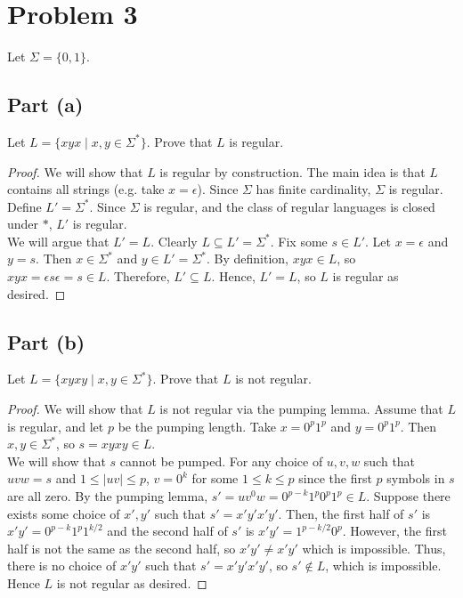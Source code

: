 \documentclass{article}
\begin{document}
\section*{Problem 3}

Let $\Sigma = \{ 0, 1 \}$.

\subsection*{Part (a)}

Let $L = \{ xyx \mid x, y \in \Sigma^* \}$. Prove that $L$ is regular.

\begin{proof}
    We will show that $L$ is regular by construction. The main idea is that $L$ contains all strings (e.g. take $x = \epsilon$). Since $\Sigma$ has finite 
    cardinality, $\Sigma$ is regular. Define $L' = \Sigma^*$. Since $\Sigma$ is regular, and the class of regular languages is closed under $*$, $L'$ is 
    regular. \\
    
    \noindent
    We will argue that $L' = L$. Clearly $L \subseteq L' = \Sigma^*$. Fix some $s \in L'$. Let $x = \epsilon$ and $y = s$. Then $x \in \Sigma^*$ and 
    $y \in L' = \Sigma^*$. By definition, $xyx \in L$, so $xyx = \epsilon s \epsilon = s \in L$. Therefore, $L' \subseteq L$. Hence, $L' = L$, so $L$ is regular 
    as desired.
\end{proof}

\subsection*{Part (b)}

Let $L = \{ xyxy \mid x, y \in \Sigma^* \}$. Prove that $L$ is not regular. 

\begin{proof}
    We will show that $L$ is not regular via the pumping lemma. Assume that $L$ is regular, and let $p$ be the pumping length. Take $x = 0^p 1^p$ and 
    $y = 0^p 1^p$. Then $x, y \in \Sigma^*$, so $s = xyxy \in L$. \\

    \noindent
    We will show that $s$ cannot be pumped. For any choice of $u, v, w$ such that $uvw = s$ and $1 \leq |uv| \leq p$, $v = 0^k$ for some $1 \leq k \leq p$ since
    the first $p$ symbols in $s$ are all zero. By the pumping lemma, $s' = uv^0w = 0^{p - k} 1^p 0^p 1^p \in L$. Suppose there exists some choice of $x', y'$ 
    such that $s' = x' y' x' y'$. Then, the first half of $s'$ is $x' y' = 0^{p - k}1^{p} 1^{k/2}$ and the second half of $s'$ is $x'y' = 1^{p-k/2}0^p$. 
    However, the first half is not the same as the second half, so $x' y' \neq x' y'$ which is impossible. Thus, there is no choice of $x' y'$ such that  
    $s' = x' y' x' y'$, so $s' \not \in L$, which is impossible. Hence $L$ is not regular as desired.
\end{proof}
\end{document}
